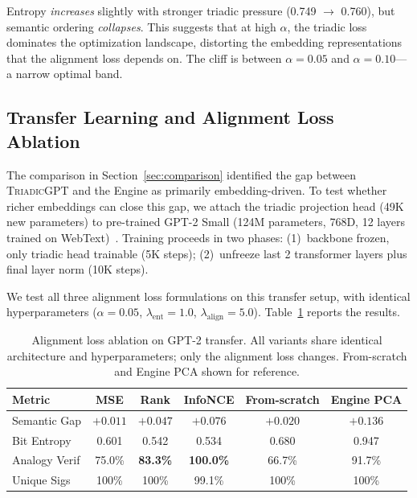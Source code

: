 \documentclass[11pt,a4paper]{article}
\newcommand{\microgpt}{\textsc{TriadicGPT}}
\begin{document}
Entropy \emph{increases} slightly with stronger triadic pressure (0.749 $\rightarrow$ 0.760), but semantic ordering \emph{collapses}. This suggests that at high $\alpha$, the triadic loss dominates the optimization landscape, distorting the embedding representations that the alignment loss depends on. The cliff is between $\alpha = 0.05$ and $\alpha = 0.10$---a narrow optimal band.


\subsection{Transfer Learning and Alignment Loss Ablation}
\label{sec:transfer}

The comparison in Section~\ref{sec:comparison} identified the gap between \microgpt{} and the Engine as primarily embedding-driven. To test whether richer embeddings can close this gap, we attach the triadic projection head (49K new parameters) to pre-trained GPT-2 Small (124M parameters, 768D, 12 layers trained on WebText)~\citep{radford2019gpt2}. Training proceeds in two phases: (1)~backbone frozen, only triadic head trainable (5K steps); (2)~unfreeze last 2 transformer layers plus final layer norm (10K steps).

We test all three alignment loss formulations on this transfer setup, with identical hyperparameters ($\alpha=0.05$, $\lambda_{\text{ent}}=1.0$, $\lambda_{\text{align}}=5.0$). Table~\ref{tab:transfer} reports the results.

\begin{table}[h]
\centering
\caption{Alignment loss ablation on GPT-2 transfer. All variants share identical architecture and hyperparameters; only the alignment loss changes. From-scratch and Engine PCA shown for reference.}
\label{tab:transfer}
\begin{tabular}{lccccc}
\toprule
Metric & MSE & Rank & \textbf{InfoNCE} & From-scratch & Engine PCA \\
\midrule
Semantic Gap    & $+0.011$ & $+0.047$ & $\mathbf{+0.076}$ & $+0.020$ & $+0.136$ \\
Bit Entropy     & 0.601    & 0.542    & 0.534             & 0.680    & 0.947 \\
Analogy Verif   & 75.0\%   & \textbf{83.3\%} & \textbf{100.0\%} & 66.7\%   & 91.7\% \\
Unique Sigs     & 100\%    & 100\%    & 99.1\%            & 100\%    & 100\% \\
\bottomrule
\end{tabular}
\end{table}
\end{document}

